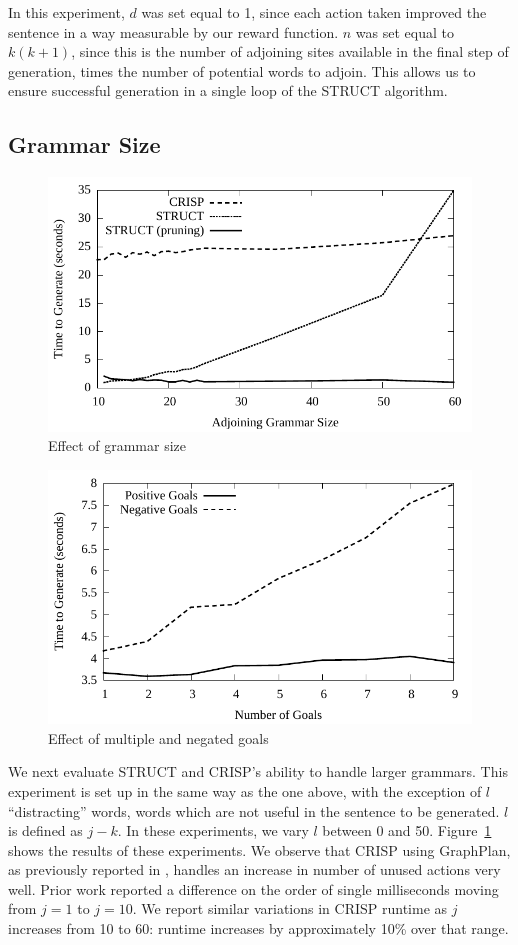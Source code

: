 In this experiment, $d$ was set equal to 1, since each action taken improved the sentence in
a way measurable by our reward function.  $n$ was set equal to $k(k + 1)$, since this is
the number of adjoining sites available in the final step of generation, times the number
of potential words to adjoin.  This allows us to ensure successful generation in a single
loop of the STRUCT algorithm.

\subsection{Grammar Size}
\begin{figure}
\centering
\includegraphics[width=0.7 \linewidth]{../analysis/plots/large-grammar/large-grammar.pdf}
\caption{Effect of grammar size}
\label{graph-large-grammars}
\end{figure}

\begin{figure}
\centering
\includegraphics[width=0.7 \linewidth]{../analysis/plots/goals/differentgoals.pdf}
\caption{Effect of multiple and negated goals}
\label{chart-different-goals}
\end{figure}

We next evaluate STRUCT and CRISP's ability to
handle larger grammars. This experiment is set up in the same way as
the one above, with the exception of $l$ ``distracting'' words, words
which are not useful in the sentence to be generated.  $l$ is defined
as $j - k$.  In these experiments, we vary $l$ between 0 and 50.
Figure~\ref{graph-large-grammars} shows the results of these
experiments.  We observe that CRISP using GraphPlan, as previously
reported in \cite{koller_experiences_2011}, handles an increase in
number of unused actions very well.  Prior work reported a difference
on the order of single milliseconds moving from $j = 1$ to $j = 10$.
We report similar variations in CRISP runtime as $j$ increases from 10
to 60: runtime increases by approximately 10\% over that range.

